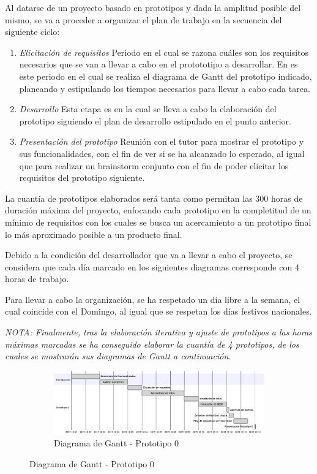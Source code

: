 Al datarse de un proyecto basado en prototipos y dada la amplitud posible del mismo, se va a proceder a organizar el plan de trabajo en la secuencia del siguiente ciclo:
\begin{enumerate}
    \item \textit{Elicitación de requisitos} \newline
    Periodo en el cual se razona cuáles son los requisitos necesarios que se van a llevar a cabo en el protototipo a desarrollar. En es este periodo en el cual se realiza el diagrama de Gantt del prototipo indicado, planeando y estipulando los tiempos necesarios para llevar a cabo cada tarea.
    
    \item \textit{Desarrollo} \newline
    Esta etapa es en la cual se lleva a cabo la elaboración del prototipo siguiendo el plan de desarrollo estipulado en el punto anterior.
    
    \item \textit{Presentación del prototipo} \newline
    Reunión con el tutor para mostrar el prototipo y sus funcionalidades, con el fin de ver si se ha alcanzado lo esperado, al igual que para realizar un brainstorm conjunto con el fin de poder elicitar los requisitos del prototipo siguiente.
\end{enumerate}

La cuantía de prototipos elaborados será tanta como permitan las 300 horas de duración máxima del proyecto, enfocando cada prototipo en la completitud de un mínimo de requisitos con los cuales se busca un acercamiento a un prototipo final lo más aproximado posible a un producto final.

Debido a la condición del desarrollador que va a llevar a cabo el proyecto, se considera que cada día marcado en los siguientes diagramas corresponde con 4 horas de trabajo.

Para llevar a cabo la organización, se ha respetado un día libre a la semana, el cual coincide con el Domingo, al igual que se respetan los días festivos nacionales.

\textit{NOTA: Finalmente, tras la elaboración iterativa y ajuste de prototipos a las horas máximas marcadas se ha conseguido elaborar la cuantía de 4 prototipos, de los cuales se mostrarán sus diagramas de Gantt a continuación.}

\begin{figure}
\begin{figure}[H]
    \centering
    \includegraphics[width=19cm]{./img/grantt/p0.png}
    \caption{Diagrama de Gantt - Prototipo 0}
    \label{fig:grant.p0}
\end{figure}
\end{figure}

